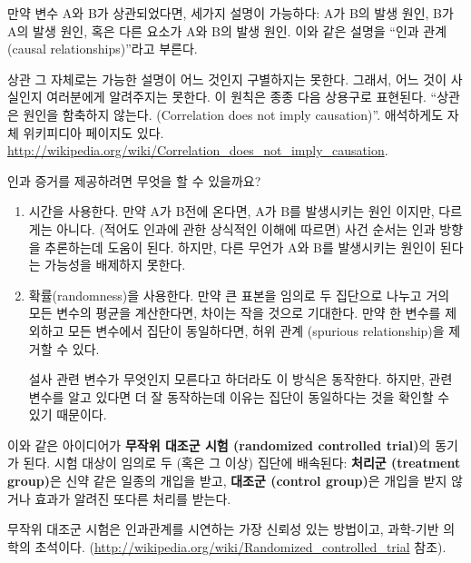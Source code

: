 만약 변수 A와 B가 상관되었다면, 세가지 설명이 가능하다: A가 B의 발생 원인, B가 A의 발생 원인, 혹은 다른 요소가 A와 B의 발생 원인. 이와 같은 설명을 ``인과 관계 (causal relationships)''라고 부른다.

상관 그 자체로는 가능한 설명이 어느 것인지 구별하지는 못한다. 그래서, 어느 것이 사실인지 여러분에게 알려주지는 못한다. 이 원칙은 종종 다음 상용구로 표현된다. ``상관은 원인을 함축하지 않는다. (Correlation
does not imply causation)''.
애석하게도 자체 위키피디아 페이지도 있다. \url{http://wikipedia.org/wiki/Correlation_does_not_imply_causation}.

인과 증거를 제공하려면 무엇을 할 수 있을까요?

\begin{enumerate}

\item 시간을 사용한다. 만약 A가 B전에 온다면, A가 B를 발생시키는 원인 이지만, 다르게는 아니다. (적어도 인과에 관한 상식적인 이해에 따르면)
사건 순서는 인과 방향을 추론하는데 도움이 된다. 하지만, 다른 무언가 A와 B를 발생시키는 원인이 된다는 가능성을 배제하지 못한다.

\item 확률(randomness)을 사용한다. 만약 큰 표본을 임의로 두 집단으로 나누고 거의 모든 변수의 평균을 계산한다면, 차이는 작을 것으로 기대한다.
만약 한 변수를 제외하고 모든 변수에서 집단이 동일하다면, 허위 관계 (spurious relationship)을 제거할 수 있다.


설사 관련 변수가 무엇인지 모른다고 하더라도 이 방식은 동작한다. 하지만, 관련 변수를 알고 있다면 더 잘 동작하는데 이유는 집단이 동일하다는 것을 확인할 수 있기 때문이다. 

\end{enumerate}

이와 같은 아이디어가 {\bf 무작위 대조군 시험 (randomized controlled
trial)}의 동기가 된다. 시험 대상이 임의로 두 (혹은 그 이상) 집단에 배속된다: {\bf 처리군 (treatment group)}은 신약 같은 일종의 개입을 받고, 
{\bf 대조군 (control group)}은 개입을 받지 않거나 효과가 알려진 또다른 처리를 받는다.


무작위 대조군 시험은 인과관계를 시연하는 가장 신뢰성 있는 방법이고, 과학-기반 의학의 초석이다. (\url{http://wikipedia.org/wiki/Randomized_controlled_trial} 참조).

